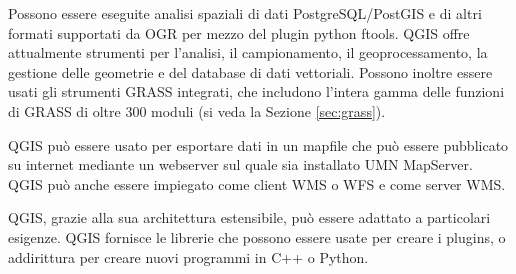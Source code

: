 
Possono essere eseguite analisi spaziali di dati PostgreSQL/PostGIS e di altri
formati supportati da OGR per mezzo del plugin python ftools. QGIS
offre attualmente strumenti per l'analisi, il campionamento, il geoprocessamento,
la gestione delle geometrie e del database di dati vettoriali. Possono
inoltre essere usati gli strumenti GRASS integrati, che includono
l'intera gamma delle funzioni di GRASS di oltre 300 moduli (si veda la Sezione \ref{sec:grass}).


QGIS può essere usato per esportare dati in un mapfile che può essere
pubblicato su internet mediante un webserver sul quale sia installato
UMN MapServer. QGIS può anche essere impiegato come client WMS o
WFS e come server WMS. 


QGIS, grazie alla sua architettura estensibile, può essere adattato a particolari 
esigenze. QGIS fornisce le librerie che possono essere usate per creare i plugins, o 
addirittura per creare nuovi programmi in C++ o Python.


